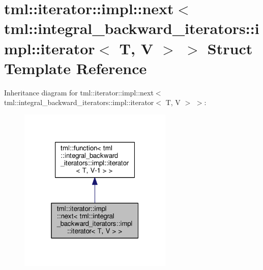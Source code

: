 \hypertarget{structtml_1_1iterator_1_1impl_1_1next_3_01tml_1_1integral__backward__iterators_1_1impl_1_1iterator_3_01_t_00_01_v_01_4_01_4}{\section{tml\+:\+:iterator\+:\+:impl\+:\+:next$<$ tml\+:\+:integral\+\_\+backward\+\_\+iterators\+:\+:impl\+:\+:iterator$<$ T, V $>$ $>$ Struct Template Reference}
\label{structtml_1_1iterator_1_1impl_1_1next_3_01tml_1_1integral__backward__iterators_1_1impl_1_1iterator_3_01_t_00_01_v_01_4_01_4}
}


Inheritance diagram for tml\+:\+:iterator\+:\+:impl\+:\+:next$<$ tml\+:\+:integral\+\_\+backward\+\_\+iterators\+:\+:impl\+:\+:iterator$<$ T, V $>$ $>$\+:
\nopagebreak
\begin{figure}[H]
\begin{center}
\leavevmode
\includegraphics[width=208pt]{structtml_1_1iterator_1_1impl_1_1next_3_01tml_1_1integral__backward__iterators_1_1impl_1_1iterat7ee3bfc124c9e33154d21a99a51c87e4}
\end{center}
\end{figure}


